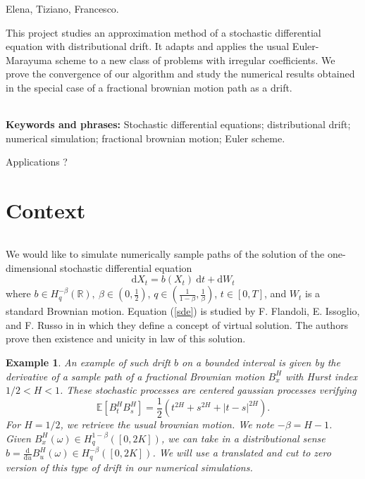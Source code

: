\documentclass[11pt]{enstaPRE}
\newtheorem{ex}{Example}
\newcommand{\de}[2]{\frac{\mathrm{d} #1}{\mathrm{d} #2}}
\newcommand{\R}{\mathbb{R}}
\newcommand{\E}{\mathbb{E}}
\newcommand{\di}{\mathrm{d}}
\begin{document}
\couverture



Elena, Tiziano, Francesco.

This project studies an approximation method of a stochastic differential equation with distributional drift. It adapts and applies the usual Euler-Marayuma scheme to a new class of problems with irregular coefficients. We prove the convergence of our algorithm and study the numerical results obtained in the special case of a fractional brownian motion path as a drift.

\paragraph{}
\textbf{Keywords and phrases:} Stochastic differential equations; distributional drift; numerical simulation; fractional brownian motion; Euler scheme.

\tableofcontents


Applications ?

\part{Context}
    \paragraph{}
    We would like to simulate numerically sample paths of the solution of the one-dimensional stochastic differential equation
    \begin{equation} \label{sde}
    \di X_t = b(X_t)\ \di t + \di W_t
    \end{equation}
    where $b\in H^{-\beta}_q(\R),\ \beta\in\left(0,\frac{1}{2}\right)$, $q\in\left(\frac{1}{1-\beta},\frac{1}{\beta}\right)$, $t\in[0,T]$, and $W_t$ is a standard Brownian motion. Equation (\ref{sde}) is studied by F. Flandoli, E. Issoglio, and F. Russo in \cite{Fla-Iss-Rus-2017} in which they define a concept of virtual solution. The authors prove then existence and unicity in law of this solution. 
    
    \begin{ex}
        An example of such drift $b$ on a bounded interval is given by the derivative of a sample path of a fractional Brownian motion $B^H_x$ with Hurst index $1/2<H<1$. These stochastic processes are centered gaussian processes verifying \begin{equation}
        \E\left[B_t^HB_s^H\right]=\frac{1}{2}\left(t^{2H}+s^{2H}+|t-s|^{2H}\right).
        \end{equation} For $H=1/2$, we retrieve the usual brownian motion. We note $-\beta = H - 1$. Given $B^H_x(\omega)\in H^{1-\beta}_q([0,2K])$, we can take in a distributional sense $b = \de{}{u}B^H_u(\omega)\in H^{-\beta}_q([0,2K])$. We will use a translated and cut to zero version of this type of drift in our numerical simulations.
    \end{ex}    
\end{document}
